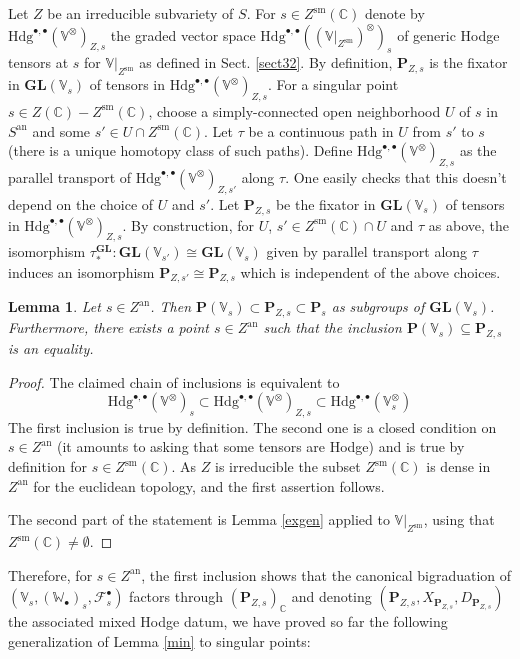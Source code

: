 \documentclass[10pt]{article}
\numberwithin{equation}{subsection}
\theoremstyle{plain}
\newtheorem{lemma}[theorem]{Lemma}
\theoremstyle{definition}
\newtheorem{definition}[theorem]{Definition}
\theoremstyle{remark}
\newcommand{\C}{\mathbb C}
\newcommand{\V}{\mathbb V}
\newcommand{\W}{\mathbb W}
\newcommand{\sm}{\mathrm{sm}}
\newcommand{\pp}{\mathbf P}
\newcommand{\bul}{\bullet}
\newcommand{\an}{\mathrm{an}}
\newcommand{\hod}{\mathrm{Hdg}}
\newcommand{\gl}{\mathbf{GL}}
\begin{document}
Let $Z$ be an irreducible subvariety of $S$. For $s \in Z^\sm(\C)$ denote by $\hod^{\bul,\bul}(\V^\otimes)_{Z,s}$ the graded vector space $\hod^{\bul,\bul}((\V\vert_{Z^\sm})^\otimes)_s$ of generic Hodge tensors at $s$ for $\V\vert_{Z^\sm}$ as defined in Sect. \ref{sect32}. By definition, $\pp_{Z,s}$ is the fixator in $\gl(\V_s)$ of tensors in $\hod^{\bul,\bul}(\V^\otimes)_{Z,s}$. For a singular point $s \in Z(\C)-Z^\sm(\C)$, choose a simply-connected open neighborhood $U$ of $s$ in $S^\an$ and some $s' \in U \cap Z^\sm(\C)$. Let $\tau$ be a continuous path in $U$ from $s'$ to $s$ (there is a unique homotopy class of such paths). Define $\hod^{\bul,\bul}(\V^\otimes)_{Z,s}$ as the parallel transport of $\hod^{\bul,\bul}(\V^\otimes)_{Z,s'}$ along $\tau$. One easily checks that this doesn't depend on the choice of $U$ and $s'$. Let $\pp_{Z,s}$ be the fixator in $\gl(\V_s)$ of tensors in $\hod^{\bul,\bul}(\V^\otimes)_{Z,s}$. By construction, for $U$, $s' \in Z^\sm(\C) \cap U$ and $\tau$ as above, the isomorphism $\tau_\ast^\gl : \gl(\V_{s'}) \cong \gl(\V_s)$ given by parallel transport along $\tau$ induces an isomorphism $\pp_{Z,s'} \cong \pp_{Z,s}$ which is independent of the above choices.
\begin{lemma}\label{inclmtz}
Let $s \in Z^\an$. Then $\pp(\V_s) \subset \pp_{Z,s} \subset \pp_s$ as subgroups of $\gl(\V_s)$. Furthermore, there exists a point $s \in Z^\an$ such that the inclusion $\pp(\V_s) \subseteq \pp_{Z,s}$ is an equality.
\end{lemma}
\begin{proof}
The claimed chain of inclusions is equivalent to
\[
\hod^{\bul,\bul}(\V^\otimes)_s \subset \hod^{\bul,\bul}(\V^\otimes)_{Z,s} \subset \hod^{\bul,\bul}(\V_s^\otimes)
\]
The first inclusion is true by definition. The second one is a closed condition on $s\in Z^\an$ (it amounts to asking that some tensors are Hodge) and is true by definition for $s \in Z^\sm(\C)$. As $Z$ is irreducible the subset $Z^\sm(\C)$ is dense in $Z^\an$ for the euclidean topology, and the first assertion follows.

The second part of the statement is Lemma \ref{exgen} applied to $\V\vert_{Z^\sm}$, using that $Z^\sm(\C) \neq \emptyset$.
\end{proof}
Therefore, for $s \in Z^\an$, the first inclusion shows that the canonical bigraduation of $(\V_s, (\W_\bul)_s, \mathcal{F}^\bul_s)$ factors through $(\pp_{Z,s})_\C$ and denoting $(\pp_{Z,s}, X_{\pp_{Z,s}}, D_{\pp_{Z,s}})$ the associated mixed Hodge datum, we have proved so far the following generalization of Lemma \ref{min} to singular points:
\end{document}
